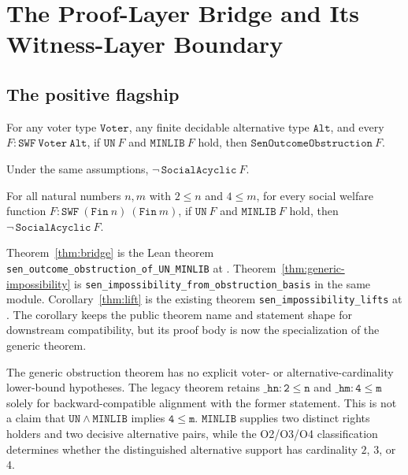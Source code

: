 \section{The Proof-Layer Bridge and Its Witness-Layer Boundary}
\label{sec:theorem}

\subsection{The positive flagship}
\label{sec:positive}

\begin{theorem}
\label{thm:bridge}
For any voter type \(\mathtt{Voter}\), any finite decidable alternative type \(\mathtt{Alt}\), and every
\(F : \mathtt{SWF}\ \mathtt{Voter}\ \mathtt{Alt}\),
if \(\mathtt{UN}\ F\) and \(\mathtt{MINLIB}\ F\) hold, then \(\mathtt{SenOutcomeObstruction}\ F\).
\end{theorem}

\begin{theorem}
\label{thm:generic-impossibility}
Under the same assumptions, \(\neg\,\mathtt{SocialAcyclic}\ F\).
\end{theorem}

\begin{corollary}
\label{thm:lift}
For all natural numbers \(n,m\) with \(2 \leq n\) and \(4 \leq m\), for every social welfare function
\(F : \mathtt{SWF}\ (\mathtt{Fin}\ n)\ (\mathtt{Fin}\ m)\),
if \(\mathtt{UN}\ F\) and \(\mathtt{MINLIB}\ F\) hold, then \(\neg\, \mathtt{SocialAcyclic}\ F\).
\end{corollary}

\begin{remark}
\label{rem:lean-form}
Theorem~\ref{thm:bridge} is the Lean theorem
\texttt{sen\_outcome\_}\allowbreak\texttt{obstruction\_of\_UN\_MINLIB} at
.
Theorem~\ref{thm:generic-impossibility} is
\texttt{sen\_impossibility\_}\allowbreak\texttt{from\_obstruction\_basis} in the same module.
Corollary~\ref{thm:lift} is the existing theorem
\texttt{sen\_impossibility\_lifts} at
.
The corollary keeps the public theorem name and statement shape for downstream compatibility, but its proof body is now the specialization of the generic theorem.
\end{remark}

\begin{remark}
\label{rem:hm-unused}
The generic obstruction theorem has no explicit voter- or alternative-cardinality lower-bound hypotheses.
The legacy theorem retains \(\mathtt{\_hn : 2 \leq n}\) and \(\mathtt{\_hm : 4 \leq m}\) solely for backward-compatible alignment with the former statement.
This is not a claim that \(\mathtt{UN \wedge MINLIB}\) implies \(\mathtt{4 \leq m}\).
\(\mathtt{MINLIB}\) supplies two distinct rights holders and two decisive alternative pairs, while the O2/O3/O4 classification determines whether the distinguished alternative support has cardinality \(2\), \(3\), or \(4\).
\end{remark}

